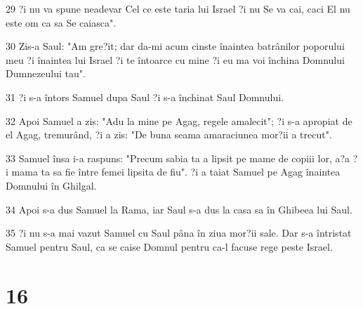 \par 29 ?i nu va spune neadevar Cel ce este taria lui Israel ?i nu Se va cai, caci El nu este om ca sa Se caiasca".
\par 30 Zis-a Saul: "Am gre?it; dar da-mi acum cinste înaintea batrânilor poporului meu ?i înaintea lui Israel ?i te întoarce cu mine ?i eu ma voi închina Domnului Dumnezeului tau".
\par 31 ?i s-a întors Samuel dupa Saul ?i s-a închinat Saul Domnului.
\par 32 Apoi Samuel a zis: "Adu la mine pe Agag, regele amalecit"; ?i s-a apropiat de el Agag, tremurând, ?i a zis: "De buna seama amaraciunea mor?ii a trecut".
\par 33 Samuel însa i-a raspuns: "Precum sabia ta a lipsit pe mame de copiii lor, a?a ?i mama ta sa fie între femei lipsita de fiu". ?i a taiat Samuel pe Agag înaintea Domnului în Ghilgal.
\par 34 Apoi s-a dus Samuel la Rama, iar Saul s-a dus la casa sa în Ghibeea lui Saul.
\par 35 ?i nu s-a mai vazut Samuel cu Saul pâna în ziua mor?ii sale. Dar s-a întristat Samuel pentru Saul, ca se caise Domnul pentru ca-l facuse rege peste Israel.

\chapter{16}

